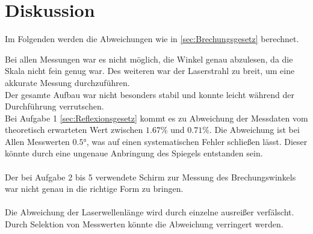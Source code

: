 \section{Diskussion}
\label{sec:Diskussion}
Im Folgenden werden die Abweichungen wie in \autoref{sec:Brechungsgesetz} berechnet.

Bei allen Messungen war es nicht möglich, die Winkel genau abzulesen, da die Skala nicht fein genug war.
Des weiteren war der Laserstrahl zu breit, um eine akkurate Messung durchzuführen.\\
Der gesamte Aufbau war nicht besonders stabil und konnte leicht während der Durchführung verrutschen.\\

Bei Aufgabe 1 \ref{sec:Reflexionsgesetz} kommt es zu Abweichung der Messdaten vom theoretisch erwarteten Wert zwischen $1.67\%$ und $0.71\%$.
Die Abweichung ist bei Allen Messwerten $0.5°$, was auf einen systematischen Fehler schließen lässt.
Dieser könnte durch eine ungenaue Anbringung des Spiegels entstanden sein.\\
\\
Der bei Aufgabe 2 bis 5 verwendete Schirm zur Messung des Brechungswinkels war nicht genau in die richtige Form zu bringen.\\
\\
Die Abweichung der Laserwellenlänge wird durch einzelne ausreißer verfälscht. 
Durch Selektion von Messwerten könnte die Abweichung verringert werden.\\


%        
